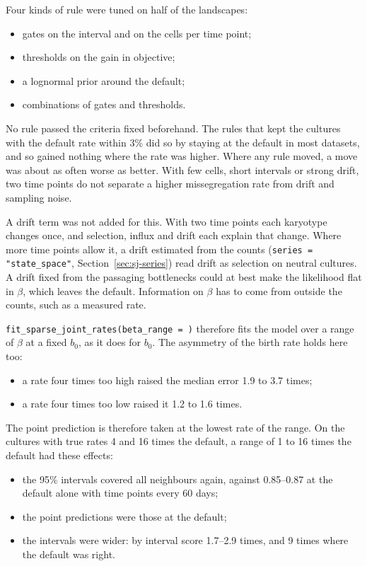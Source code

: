 \documentclass[11pt]{article}
\begin{document}
Four kinds of rule were tuned on half of the landscapes:
\begin{itemize}
\item gates on the interval and on the cells per time point;
\item thresholds on the gain in objective;
\item a lognormal prior around the default;
\item combinations of gates and thresholds.
\end{itemize}
No rule passed the criteria fixed beforehand. The rules that kept the
cultures with the default rate within 3\% did so by staying at the default
in most datasets, and so gained nothing where the rate was higher. Where any
rule moved, a move was about as often worse as better. With few cells,
short intervals or strong drift, two time points do not separate a higher
missegregation rate from drift and sampling noise.

A drift term was not added for this. With two time points each karyotype
changes once, and selection, influx and drift each explain that change.
Where more time points allow it, a drift estimated from the counts
(\texttt{series = "state\_space"}, Section~\ref{sec:sj-series}) read drift as
selection on neutral cultures. A drift fixed from the passaging bottlenecks
could at best make the likelihood flat in $\beta$, which leaves the default.
Information on $\beta$ has to come from outside the counts, such as a
measured rate.

\texttt{fit\_sparse\_joint\_rates(beta\_range = )} therefore fits the model
over a range of $\beta$ at a fixed $b_0$, as it does for $b_0$. The
asymmetry of the birth rate holds here too:
\begin{itemize}
\item a rate four times too high raised the median error 1.9 to 3.7 times;
\item a rate four times too low raised it 1.2 to 1.6 times.
\end{itemize}
The point prediction is therefore taken at the lowest rate of the range.
On the cultures with true rates 4 and 16 times the default, a range of 1 to
16 times the default had these effects:
\begin{itemize}
\item the 95\% intervals covered all neighbours again, against 0.85--0.87
  at the default alone with time points every 60 days;
\item the point predictions were those at the default;
\item the intervals were wider: by interval score 1.7--2.9 times, and 9
  times where the default was right.
\end{itemize}
\end{document}
